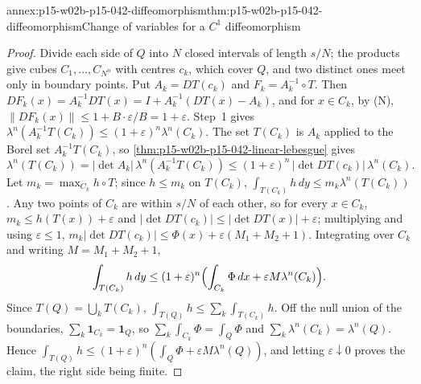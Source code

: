 \begin{annexitem}{annex:p15-w02b-p15-042-diffeomorphism}{thm:p15-w02b-p15-042-diffeomorphism}{Change of variables for a \(C^1\) diffeomorphism}
\begin{proof}
Divide each side of \(Q\) into \(N\) closed intervals of length \(s/N\);
the products give cubes \(C_1,\ldots,C_{N^n}\) with centres \(c_k\), which
cover \(Q\), and two distinct ones meet only in boundary points. Put
\(A_k=DT(c_k)\) and \(F_k=A_k^{-1}\circ T\). Then
\(DF_k(x)=A_k^{-1}DT(x)=I+A_k^{-1}(DT(x)-A_k)\), and for \(x\in C_k\), by
(N), \(\|DF_k(x)\|\leq1+B\cdot\varepsilon/B=1+\varepsilon\). Step~1 gives
\(\lambda^n(A_k^{-1}T(C_k))\leq(1+\varepsilon)^n\lambda^n(C_k)\). The set
\(T(C_k)\) is \(A_k\) applied to the Borel set \(A_k^{-1}T(C_k)\), so
\cref{thm:p15-w02b-p15-042-linear-lebesgue} gives
\[
 \lambda^n(T(C_k))=|\det A_k|\,\lambda^n(A_k^{-1}T(C_k))
   \leq(1+\varepsilon)^n\,|\det DT(c_k)|\,\lambda^n(C_k).
\]
Let \(m_k=\max_{C_k}h\circ T\); since \(h\leq m_k\) on \(T(C_k)\),
\(\int_{T(C_k)}h\,dy\leq m_k\lambda^n(T(C_k))\). Any two points of \(C_k\)
are within \(s/N\) of each other, so for every \(x\in C_k\),
\(m_k\leq h(T(x))+\varepsilon\) and
\(|\det DT(c_k)|\leq|\det DT(x)|+\varepsilon\); multiplying and using
\(\varepsilon\leq1\),
\(m_k|\det DT(c_k)|\leq\Phi(x)+\varepsilon(M_1+M_2+1)\). Integrating over
\(C_k\) and writing \(M=M_1+M_2+1\),
\[
 \int_{T(C_k)}h\,dy\leq(1+\varepsilon)^n
   \Bigl(\int_{C_k}\Phi\,dx+\varepsilon M\lambda^n(C_k)\Bigr).
\]
Since \(T(Q)=\bigcup_kT(C_k)\), \(\int_{T(Q)}h\leq\sum_k\int_{T(C_k)}h\).
Off the null union of the boundaries,
\(\sum_k\mathbf 1_{C_k}=\mathbf 1_Q\), so \(\sum_k\int_{C_k}\Phi=\int_Q\Phi\)
and \(\sum_k\lambda^n(C_k)=\lambda^n(Q)\). Hence
\(\int_{T(Q)}h\leq(1+\varepsilon)^n(\int_Q\Phi+\varepsilon M\lambda^n(Q))\),
and letting \(\varepsilon\downarrow0\) proves the claim, the right side being
finite.


\end{proof}
\end{annexitem}
